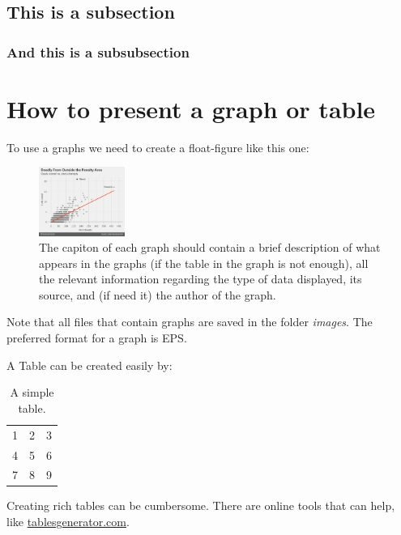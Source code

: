 \documentclass[11pt,a4paper,oneside]{book}
\begin{document}
\subsection{This is a subsection}
\subsubsection{And this is a subsubsection}

\section{How to present a graph or table}
\label{sec:floats}
To use a graphs we need to create a float-figure like this one:
\begin{figure}[h!]
  \centering
    \includegraphics[width=0.25\textwidth]{example}
    \caption{The capiton of each graph should contain a brief description of what appears in the graphs (if the table in the graph is not enough), all the relevant information regarding the type of data displayed, its source, and (if need it) the author of the graph.}
    \label{fig:messi_vs_ronaldo}
\end{figure}

Note that all files that contain graphs are saved in the folder \textit{images}. The preferred format for a graph is EPS.

A Table can be created easily by:
\begin{table}[h!]
  \centering
    \begin{tabular}{| l c r |}
    \hline
    1 & 2 & 3 \\
    4 & 5 & 6 \\
    7 & 8 & 9 \\
    \hline
    \end{tabular}
  \caption{A simple table.}
  \label{tab:simple_table}
\end{table}

Creating rich tables can be cumbersome. There are online tools that can help, like \href{https://www.tablesgenerator.com/}{tablesgenerator.com}.
\end{document}
